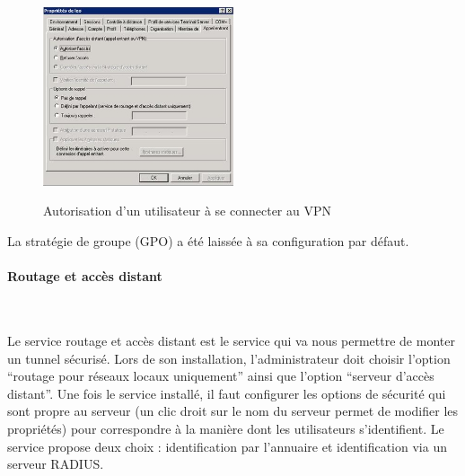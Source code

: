 \begin{figure}[H]
	\begin{center}
		\includegraphics[width=0.50\textwidth]{partie_2/screen_windows/vpn.JPG}\\
	\end{center}
	\caption{Autorisation d'un utilisateur à se connecter au VPN}
	\label{VPN_AUTORISATION}
\end{figure}

La stratégie de groupe (GPO) a été laissée à sa configuration par défaut.


\paragraph{Routage et accès distant}
~\


Le service routage et accès distant est le service qui va nous permettre de monter un tunnel sécurisé. Lors de son installation, l'administrateur doit choisir l'option ``routage pour réseaux locaux uniquement'' ainsi que l'option ``serveur d'accès distant''. Une fois le service installé, il faut configurer les options de sécurité qui sont propre au serveur (un clic droit sur le nom du serveur permet de modifier les propriétés) pour correspondre à la manière dont les utilisateurs s'identifient. Le service propose deux choix : identification par l'annuaire et identification via un serveur RADIUS.

